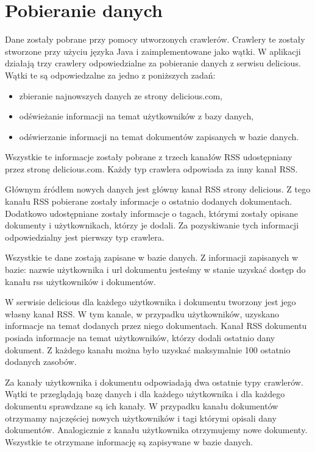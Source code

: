 \section{Pobieranie danych}
\label{sec:pobieranie_danych}

Dane zostały pobrane przy pomocy utworzonych crawlerów. Crawlery te zostały stworzone przy użyciu języka Java i zaimplementowane jako wątki. W aplikacji działają trzy crawlery odpowiedzialne za pobieranie danych z serwisu delicious. Wątki te są odpowiedzalne za jedno z poniższych zadań:
\begin{itemize}
\item zbieranie najnowszych danych ze strony delicious.com,
\item odświeżanie informacji na temat użytkowników z bazy danych,
\item odświerzanie informacji na temat dokumentów zapisanych w bazie danych.
\end{itemize}

Wszystkie te informacje zostały pobrane z trzech kanałów RSS  udostępniany przez stronę delicious.com. Każdy typ crawlera odpowiada za inny kanał RSS.

Głównym źródłem nowych danych jest główny kanał RSS strony delicious. Z tego  kanału RSS pobierane zostały informacje o ostatnio dodanych dokumentach. Dodatkowo udostępniane zostały informacje o tagach, którymi zostały opisane dokumenty i użytkownikach, którzy je dodali. Za pozyskiwanie tych informacji odpowiedzialny jest pierwszy typ crawlera.

Wszystkie te dane zostają zapisane w bazie danych. Z informacji zapisanych w bazie: nazwie użytkownika i url dokumentu jesteśmy w stanie uzyskać dostęp do kanału rss użytkowników i dokumentów.

W serwisie delicious dla każdego użytkownika i dokumentu tworzony jest jego własny kanał RSS. W tym kanale, w przypadku użytkowników, uzyskano informacje na temat dodanych przez niego dokumentach. Kanał RSS dokumentu posiada informacje na temat użytkowników, którzy dodali ostatnio dany dokument. Z każdego kanału można było uzyskać maksymalnie 100 ostatnio dodanych zasobów.

Za kanały użytkownika i dokumentu odpowiadają dwa ostatnie typy crawlerów. Wątki te przeglądają bazę danych i dla każdego użytkownika i dla każdego dokumentu sprawdzane są ich kanały. W przypadku kanału dokumentów otrzymamy najczęściej nowych użytkowników i tagi którymi opisali dany dokumentów. Analogicznie z kanału użytkownika otrzymujemy nowe dokumenty. Wszystkie te otrzymane informację są zapisywane w bazie danych.

